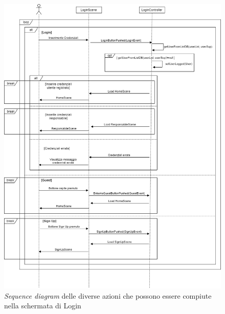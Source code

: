 \documentclass[a4paper,12pt,titlepage]{article}
\begin{document}
{{{\begin{figure}[H]
		\includegraphics[scale=0.45]{sequenceDiagramLogin}
		\caption{\textit{Sequence diagram} delle diverse azioni che possono essere compiute nella schermata di Login}
\end{figure}

}}}
\end{document}
